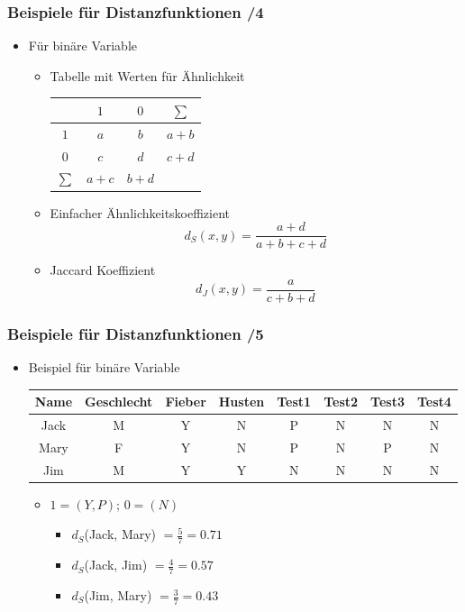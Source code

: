 
\begin{frame}%
\frametitle{Beispiele für Distanzfunktionen /4}

\begin{itemize}
\item Für binäre Variable
\begin{itemize}
\item Tabelle mit Werten für Ähnlichkeit

\begin{center}
\begin{tabular}{|c||c|c|c|}
\hline
  & $1$ & $0$ & $\sum$ \\
\hline
\hline
$1$ & $a$ & $b$ & $a+b$ \\
\hline
$0$ & $c$ & $d$ & $c+d$ \\
\hline
$\sum$ & $a+c$ & $b+d$ & \\
\hline
\end{tabular}
\end{center}

\item Einfacher Ähnlichkeitskoeffizient
$$d_S(x,y) = \frac{a+d}{a+b+c+d}$$
\item Jaccard Koeffizient
$$d_J(x,y) = \frac{a}{c+b+d}$$
\end{itemize}
\end{itemize}

\end{frame}


\begin{frame}%
\frametitle{Beispiele für Distanzfunktionen /5}

\begin{itemize}
\item Beispiel für binäre Variable
{\footnotesize
\begin{tabular}{|c|c|c|c|c|c|c|c|}
\hline
Name & Geschlecht & Fieber & Husten & Test1 & Test2 & Test3 & Test4 \\
\hline
Jack & M & Y & N & P & N & N & N \\
Mary & F & Y & N & P & N & P & N \\
Jim  & M & Y & Y & N & N & N & N \\
\hline
\end{tabular}}

\begin{itemize}
\item $1 = (Y,P)$; $0 = (N)$
\begin{itemize}
\item $d_S$(Jack, Mary) $= \frac{5}{7} = 0.71$
\item $d_S$(Jack, Jim) $= \frac{4}{7} = 0.57$
\item $d_S$(Jim, Mary) $= \frac{3}{7} = 0.43$
\end{itemize}
\end{itemize}
\end{itemize}


\end{frame}

